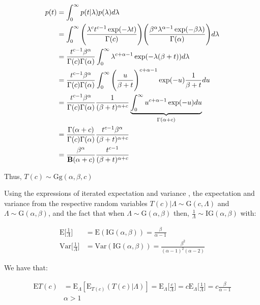 \begin{align*}
p(t) &= \int_0^{\infty} p(t|\lambda) p(\lambda) d\lambda\\
&= \int_0^{\infty}\Bigg( \frac{\lambda^ct^{c-1}\exp(-\lambda t)}{\Gamma(c)}\Bigg)\Bigg(\frac{\beta^{\alpha}\lambda^{\alpha-1}\exp(-\beta \lambda)}{\Gamma(\alpha)}\Bigg)d\lambda \\
&=\frac{t^{c-1}\beta^{\alpha}}{\Gamma(c)\Gamma(\alpha)}\int_0^{\infty}\lambda^{c+\alpha-1}\exp(-\lambda(\beta+t))d\lambda\\
&=\frac{t^{c-1}\beta^{\alpha}}{\Gamma(c)\Gamma(\alpha)}\int_0^{\infty}\Bigg(\frac{u}{\beta+t}\Bigg)^{c+\alpha-1}\exp(-u)\frac{1}{\beta+t} du \\
&=\frac{t^{c-1}\beta^{\alpha}}{\Gamma(c)\Gamma(\alpha)}\frac{1}{(\beta+t)^{\alpha+c}}\underbrace{\int_0^{\infty}u^{c+\alpha-1}\exp(-u)du}_{\Gamma(\alpha+c)} \\
&=\frac{\Gamma(\alpha+c)}{\Gamma(c)\Gamma(\alpha)}\frac{t^{c-1}\beta^{\alpha}}{(\beta+t)^{\alpha+c}}\\
&=\frac{\beta^{\alpha}}{{\mathbf{B}}(\alpha + c)}\frac{t^{c-1}}{(\beta+t)^{\alpha+c}}
\end{align*}

Thus, $T(c)\sim \textrm{Gg} (\alpha, \beta, c)$

Using the expressions of iterated expectation and variance \citep{held2014applied}, the expectation and variance from the respective random variables $T(c)|\Lambda \sim \textrm{G}(c, \Lambda)$ and $\Lambda \sim \textrm{G}(\alpha,\beta)$, and the fact that when $\Lambda \sim \textrm{G}(\alpha, \beta)$ then, $\frac{1}{\Lambda} \sim \textrm{IG}(\alpha, \beta)$ with:

\begin{align*}
\textrm{E}\Bigg [\frac{1}{\Lambda}\Bigg ] &=\textrm{E}(\textrm{IG}(\alpha, \beta)) = \frac{\beta}{\alpha-1}\\
\textrm{Var}\Bigg [\frac{1}{\Lambda}\Bigg ] & =\textrm{Var}(\textrm{IG}(\alpha, \beta)) = \frac{\beta^2}{(\alpha-1)^2(\alpha-2)}
\end{align*}

We have that:

\begin{align*}
\textrm{E}T(c) &= \textrm{E}_{\Lambda}[\textrm{E}_{T(c)} (T(c)|\Lambda)] = \textrm{E}_{\Lambda}\Bigg [\frac{c}{\Lambda}\Bigg ] = c \textrm{E}_{\Lambda}\Bigg [\frac{1}{\Lambda}\Bigg ] = c\frac{\beta}{\alpha-1}\\
&\alpha>1
\end{align*}


